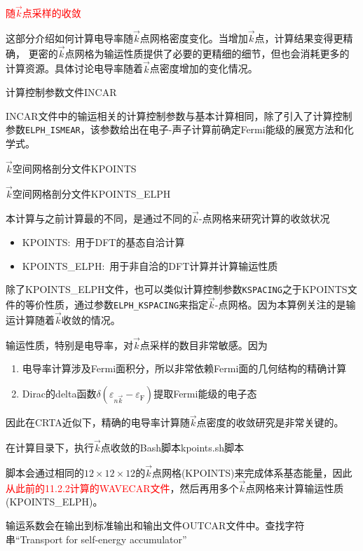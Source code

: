 {\textcolor{red}{随$\vec k$点采样的收敛}

这部分介绍如何计算电导率随$\vec k$点网格密度变化。当增加$\vec k$点，计算结果变得更精确，%
更密的$\vec k$点网格为输运性质提供了必要的更精细的细节，但也会消耗更多的计算资源。具体讨论电导率随着$\vec k$点密度增加的变化情况。

计算控制参数文件\textrm{INCAR}

\textrm{INCAR}文件中的输运相关的计算控制参数与基本计算相同，除了引入了计算控制参数\texttt{ELPH\_ISMEAR}，该参数给出在电子-声子计算前确定\textrm{Fermi}能级的展宽方法和化学式。

$\vec k$空间网格剖分文件\textrm{KPOINTS}

$\vec k$空间网格剖分文件\textrm{KPOINTS\_ELPH}

本计算与之前计算最的不同，是通过不同的$\vec k$-点网格来研究计算的收敛状况
\begin{itemize}
	\item \textrm{KPOINTS}:~用于\textrm{DFT}的基态自洽计算
	\item \textrm{KPOINTS\_ELPH}:~用于非自洽的\textrm{DFT}计算并计算输运性质
\end{itemize}

除了\textrm{KPOINTS\_ELPH}文件，也可以类似计算控制参数\texttt{KSPACING}之于\textrm{KPOINTS}文件的等价性质，通过参数\texttt{ELPH\_KSPACING}来指定$\vec k$-点网格。因为本算例关注的是输运计算随着$\vec k$收敛的情况。

输运性质，特别是电导率，对$\vec k$点采样的数目非常敏感。因为
\begin{enumerate}
	\item 电导率计算涉及\textrm{Fermi}面积分，所以非常依赖\textrm{Fermi}面的几何结构的精确计算
	\item \textrm{Dirac}的\textrm{delta}函数$\delta(\varepsilon_{n\vec k}-\varepsilon_{\mathrm{F}})$提取\textrm{Fermi}能级的电子态
\end{enumerate}
因此在\textrm{CRTA}近似下，精确的电导率计算随$\vec k$点密度的收敛研究是非常关键的。

在计算目录下，执行$\vec k$点收敛的\textrm{Bash}脚本\textrm{kpoints.sh}脚本

脚本会通过相同的$12\times12\times12$的$\vec k$点网格\textrm{(KPOINTS)}来完成体系基态能量，因此\textcolor{red}{从此前的11.2.2计算的\textrm{WAVECAR}文件}，然后再用多个$\vec k$点网格来计算输运性质(\textrm{KPOINTS\_ELPH})。

输运系数会在输出到标准输出和输出文件\textrm{OUTCAR}文件中。查找字符串\textrm{``Transport for self-energy accumulator''}

}

